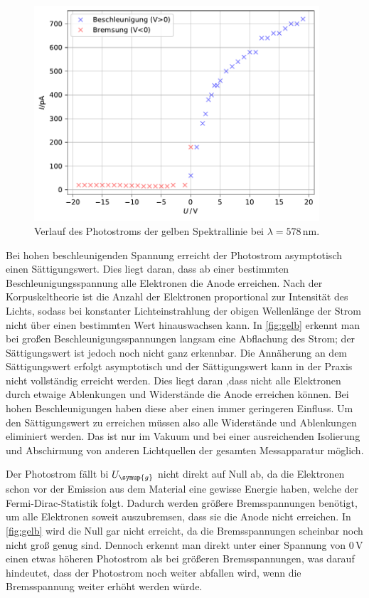     
\begin{figure}
    \centering
    \includegraphics[height = 8cm]{build/plotgelb.pdf}
    \caption{Verlauf des Photostroms der gelben Spektrallinie bei $\lambda = 578 \,\unit{\nm}$.}
    \label{fig:gelb}
\end{figure}
Bei hohen beschleunigenden Spannung erreicht der Photostrom asymptotisch einen Sättigungswert. Dies liegt daran, dass ab einer bestimmten
Beschleunigungsspannung alle Elektronen die Anode erreichen. Nach der Korpuskeltheorie ist die Anzahl der Elektronen proportional zur Intensität 
des Lichts, sodass bei konstanter Lichteinstrahlung der obigen Wellenlänge der Strom nicht über einen bestimmten Wert hinauswachsen kann. In 
\autoref{fig:gelb} erkennt man bei großen Beschleunigungsspannungen langsam eine Abflachung des Strom; der Sättigungswert ist jedoch noch nicht ganz erkennbar.
Die Annäherung an dem Sättigungswert erfolgt asymptotisch und der Sättigungswert kann in der Praxis nicht vollständig erreicht werden. Dies liegt daran ,dass 
nicht alle Elektronen durch etwaige Ablenkungen und Widerstände die Anode erreichen können. Bei hohen Beschleunigungen haben diese aber einen immer geringeren 
Einfluss. Um den Sättigungswert zu erreichen müssen also alle Widerstände und Ablenkungen eliminiert werden. Das ist nur im Vakuum und bei einer ausreichenden 
Isolierung und Abschirmung von anderen Lichtquellen der  gesamten Messapparatur möglich.

Der Photostrom fällt bi $U_{\symup{g}}$ nicht direkt auf Null ab, da die Elektronen schon vor der Emission aus dem Material eine gewisse Energie 
haben, welche der Fermi-Dirac-Statistik folgt. Dadurch werden größere Bremsspannungen benötigt, um alle Elektronen soweit auszubremsen, dass sie die 
Anode nicht erreichen. In \autoref{fig:gelb} wird die Null gar nicht erreicht, da die Bremsspannungen scheinbar noch nicht groß genug sind. Dennoch erkennt 
man direkt unter einer Spannung von $0\,\unit{\volt}$ einen etwas höheren Photostrom als bei größeren Bremsspannungen, was darauf hindeutet, dass 
der Photostrom noch weiter abfallen wird, wenn die Bremsspannung weiter erhöht werden würde.

